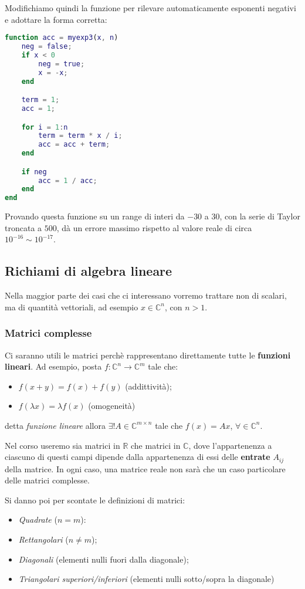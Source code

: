 \documentclass[a4paper,11pt]{article}
\begin{document}
Modifichiamo quindi la funzione per rilevare automaticamente esponenti negativi e adottare la forma corretta:

\begin{lstlisting}[language=matlab, style=codestyle]	
function acc = myexp3(x, n)
    neg = false;
    if x < 0
        neg = true;
        x = -x;
    end

    term = 1;
    acc = 1;

    for i = 1:n
        term = term * x / i;
        acc = acc + term;
    end

    if neg
        acc = 1 / acc;
    end
end
\end{lstlisting}

Provando questa funzione su un range di interi da $-30$ a $30$, con la serie di Taylor troncata a $500$, dà un errore massimo rispetto al valore reale di circa $10^{-16} \sim 10^{-17}$.

\subsection{Richiami di algebra lineare}
Nella maggior parte dei casi che ci interessano vorremo trattare non di scalari, ma di quantità vettoriali, ad esempio $x \in \mathbb{C}^n$, con $n > 1$.

\subsubsection{Matrici complesse}
Ci saranno utili le matrici perchè rappresentano direttamente tutte le \textbf{funzioni lineari}. 
Ad esempio, posta $f: \mathbb{C}^n \rightarrow \mathbb{C}^m$ tale che:
\begin{itemize}
	\item $ f(x + y) = f(x) + f(y) $ (addittività);
	\item $f(\lambda x) = \lambda f(x)$ (omogeneità)
\end{itemize}
detta \textit{funzione lineare} allora $\exists ! A \in \mathbb{C}^{m \times n}$ tale che $f(x) = A x$,  $\forall \in \mathbb{C}^n$.

Nel corso useremo sia matrici in $\mathbb{R}$ che matrici in $\mathbb{C}$, dove l'appartenenza a ciascuno di questi campi dipende dalla appartenenza di essi delle \textbf{entrate} $A_{ij}$ della matrice.
In ogni caso, una matrice reale non sarà che un caso particolare delle matrici complesse.

Si danno poi per scontate le definizioni di matrici:
\begin{itemize}
	\item \textit{Quadrate} ($n = m$):
	\item \textit{Rettangolari} ($n \neq m$);
	\item \textit{Diagonali} (elementi nulli fuori dalla diagonale);
	\item \textit{Triangolari superiori/inferiori} (elementi nulli sotto/sopra la diagonale) 
\end{itemize}
\end{document}
